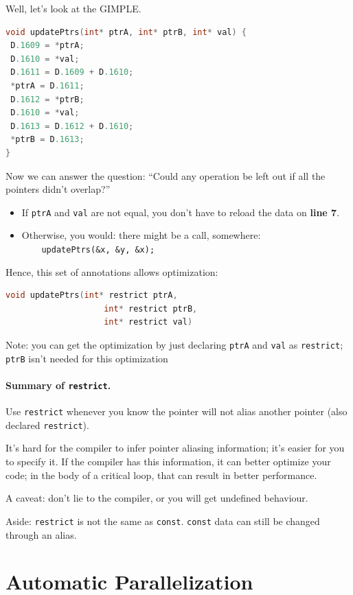 \documentclass[a4paper]{report}
\begin{document}
Well, let's look at the GIMPLE.
\begin{lstlisting}[language=C]
void updatePtrs(int* ptrA, int* ptrB, int* val) {
 D.1609 = *ptrA;
 D.1610 = *val;
 D.1611 = D.1609 + D.1610;
 *ptrA = D.1611;
 D.1612 = *ptrB;
 D.1610 = *val;
 D.1613 = D.1612 + D.1610;
 *ptrB = D.1613;
}
\end{lstlisting}

Now we can answer the question: ``Could any operation be left out if
all the pointers didn't overlap?''

\begin{itemize}
\item If {\tt ptrA} and {\tt val} are not equal, you don't have to
      reload the data on {\bf line 7}.
\item Otherwise, you would: there might be a call, somewhere:\\\verb+    updatePtrs(&x, &y, &x);+
\end{itemize}

Hence, this set of annotations allows optimization:
\begin{lstlisting}[language=C]
    void updatePtrs(int* restrict ptrA, 
                    int* restrict ptrB,
                    int* restrict val)
\end{lstlisting}
Note: you can get the optimization by just declaring {\tt ptrA} and
      {\tt val} as {\tt restrict}; {\tt ptrB} isn't needed for this optimization

\paragraph{Summary of {\tt restrict}.}
Use {\tt restrict} whenever you know the pointer will not alias
another pointer (also declared {\tt restrict}).

It's hard for the compiler to infer pointer aliasing information;
it's easier for you to specify it. If the compiler has this information,
it can better optimize your code; in the body of a critical loop, that
can result in better performance.

A caveat: don't lie to the compiler, or you will get undefined behaviour.

Aside: {\tt restrict} is not the same as {\tt const}. {\tt const} data can still be
changed through an alias.



\section*{Automatic Parallelization}
\end{document}
